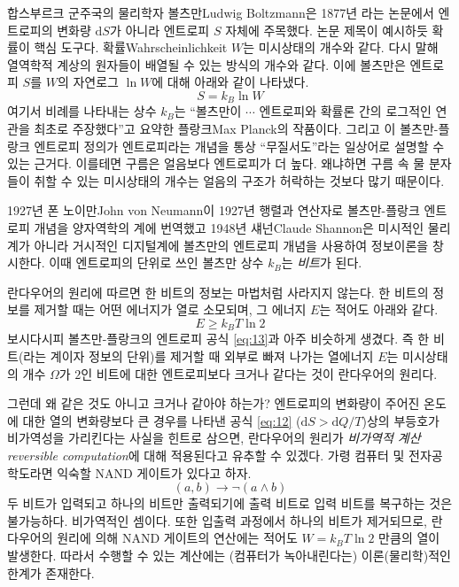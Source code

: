 \documentclass[a4paper,chapter,atbegshi]{oblivoir}
\begin{document}
합스부르크 군주국의 물리학자 볼츠만{\tiny Ludwig 
Boltzmann}은 1877년 라는 논문에서 엔트로피의
변화량 $\textrm{d}S$가 아니라 엔트로피 $S$ 자체에 주목했다. 논문 제목이
예시하듯 확률이 핵심 도구다. 확률{\tiny Wahrscheinlichkeit} $W$는
미시상태의 개수와 같다. 다시 말해 열역학적 계상의 원자들이 배열될 수 있는
방식의 개수와 같다. 이에 볼츠만은 엔트로피 $S$를 $W$의 자연로그 $\ln W$에
대해 아래와 같이 나타냈다.
\begin{equation}\label{eq:13}
  S=k_B\ln W
\end{equation}
여기서 비례를 나타내는 상수 $k_B$는 ``볼츠만이 $\cdots$ 엔트로피와 확률론 
간의 로그적인 연관을 최초로 주장했다''고 요약한 플랑크{\tiny Max Planck}의
작품이다. 그리고 이 볼츠만-플랑크 엔트로피 정의가 엔트로피라는 개념을 
통상 ``무질서도''라는 일상어로 설명할 수 있는 근거다. 이를테면 구름은 
얼음보다 엔트로피가 더 높다. 왜냐하면 구름 속 물 분자들이
취할 수 있는 미시상태의 개수는 얼음의 구조가 허락하는 것보다 많기 때문이다.

1927년 폰 노이만{\tiny John von Neumann}이 1927년 행렬과 연산자로 볼츠만-플랑크 
엔트로피 개념을 양자역학의 계에 번역했고 1948년 섀넌{\tiny Claude Shannon}은
미시적인 물리계가 아니라 거시적인 디지털계에 볼츠만의 엔트로피 개념을 사용하여
정보이론을 창시한다. 이때 엔트로피의 단위로 쓰인 볼츠만 상수 $k_B$는 \emph{비트}가
된다. 

란다우어의 원리에 따르면 한 비트의 정보는 마법처럼 사라지지 않는다.
한 비트의 정보를 제거할 때는 어떤 에너지가 열로 소모되며, 그 에너지 $E$는 적어도
아래와 같다. 
\begin{equation}
  E\geq k_B T \ln 2
\end{equation}
보시다시피 볼츠만-플랑크의 엔트로피 공식 \ref{eq:13}과 아주 비슷하게 생겼다.
즉 한 비트(라는 계이자 정보의 단위)를 제거할 때 외부로 빠져 나가는 열에너지
$E$는 미시상태의 개수 $\Omega$가 $2$인 비트에 대한 엔트로피보다 크거나 같다는
것이 란다우어의 원리다.

그런데 왜 같은 것도 아니고 크거나 같아야 하는가? 엔트로피의 변화량이 주어진 온도에
대한 열의 변화량보다 큰 경우를 나타낸 공식 \ref{eq:12} ($\textrm{d}S>
\textrm{d}Q/T$)상의 부등호가 비가역성을 가리킨다는 사실을 힌트로 삼으면,
란다우어의 원리가 \emph{비가역적 계산\tiny reversible computation}에 대해 
적용된다고 유추할 수 있겠다. 가령 컴퓨터 및 전자공학도라면 익숙할 NAND 게이트가
있다고 하자. 
\[
  (a,b) \rightarrow \neg(a \wedge b)
\]
두 비트가 입력되고 하나의 비트만 출력되기에 출력 비트로 입력 비트를 복구하는
것은 불가능하다. 비가역적인 셈이다. 또한 입출력 과정에서 하나의 비트가 제거되므로,
란다우어의 원리에 의해 NAND 게이트의 연산에는 적어도 $W=k_BT\ln2$ 만큼의 열이
발생한다. 따라서 수행할 수 있는 계산에는 (컴퓨터가 녹아내린다는) 이론(물리학)적인
한계가 존재한다. 
\end{document}
